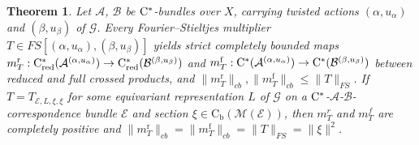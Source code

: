 \documentclass[11 pt, leqno]{amsart}
\numberwithin{equation}{section}
\theoremstyle{plain}
\newtheorem{thm}{Theorem}[section]
\theoremstyle{definition}
\newcommand*{\contb}{\mathrm{C_b}}%
\DeclareMathOperator{\red}{red}%
\DeclareMathOperator{\rd}{r}%
\DeclareMathOperator{\f}{f}%
\newcommand{\B}{\mathcal B}
\newcommand{\M}{\mathcal M}
\newcommand{\m}{m}
\newcommand{\G}{\mathcal G} %
\newcommand{\EE}{\mathcal E}
\newcommand{\A}{\mathcal A}
\newcommand{\cst}{\ifmmode\mathrm{C}^*\else{$\mathrm{C}^*$}\fi}
\begin{document}
\begin{thm}\label{thm:FSmultiplier_extends_to_reduced_and_full} 
Let $\A$, $\B$  be $\cst$-bundles over $X$, carrying twisted actions $(\alpha,u_\alpha)$ and $(\beta,u_\beta)$ of $\G$.
Every Fourier--Stieltjes multiplier $T\in FS[(\alpha,u_{\alpha}),(\beta,u_{\beta})]$ yields strict completely bounded maps $\m_T^{\rd} : \cst_{\red}(\A^{(\alpha,u_{\alpha})})\to \cst_{\red}(\B^{(\beta,u_{\beta})})$ and $\m_T^{\f} : \cst(\A^{(\alpha,u_{\alpha})})\to \cst(\B^{(\beta,u_{\beta})})$ between reduced and full crossed products, and $\|\m_T^{\rd}\|_{cb} , \|\m_T^{\f}\|_{cb} \leq \|T\|_{FS}$. 
If $T=T_{\EE,L,\xi,\xi}$ for some equivariant representation $L$ of $\G$ on a $\cst$-$\A$-$\B$-correspondence bundle $\EE$ and section $\xi \in \contb(\M(\EE))$, then $\m_T^{r}$ and $\m_T^{f}$ are completely positive and $\|\m_T^{\rd}\|_{cb} = \| \m_T^{\f} \|_{cb} = \| T \|_{FS} = \|\xi\|^2$.
\end{thm}
\end{document}
